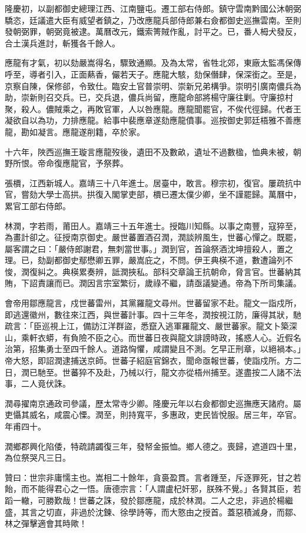 \begin{pinyinscope}
隆慶初，以副都御史總理江西、江南鹽屯。遷工部右侍郎。鎮守雲南黔國公沐朝弼驕恣，廷議遣大臣有威望者鎮之，乃改應龍兵部侍郎兼右僉都御史巡撫雲南。至則發朝弼罪，朝弼竟被逮。萬曆改元，鐵索箐賊作亂，討平之。已，番人栂犬發反，合土漢兵進討，斬獲各千餘人。

應龍有才氣，初以劾嚴嵩得名，驟致通顯。及為太常，省牲北郊，東廠太監馮保傳呼至，導者引入，正面爇香，儼若天子。應龍大駭，劾保僭肆，保深銜之。至是，京察自陳，保修郤，令致仕。臨安土官普崇明、崇新兄弟構爭。崇明引廣南儂兵為助，崇新則召交兵。已，交兵退，儂兵尚留，應龍命部將楊守廉往剿。守廉掠村聚，殺人。儂賊乘之，再敗官軍，人以咎應龍。應龍聞罷官，不俟代徑歸。代者王凝欲自以為功，力排應龍。給事中裴應章遂劾應龍僨事。巡按御史郭廷梧雅不善應龍，勘如凝言。應龍遂削籍，卒於家。

十六年，陜西巡撫王璇言應龍歿後，遺田不及數畝，遺址不過數楹，恤典未被，朝野所恨。帝命復應龍官，予祭葬。

張檟，江西新城人。嘉靖三十八年進士。居臺中，敢言。穆宗初，復官。屢疏抗中官，嘗劾大學士高拱。拱復入閣掌吏部，檟已遷太僕少卿，坐不謹罷歸。萬曆中，累官工部右侍郎。

林潤，字若雨，莆田人。嘉靖三十五年進士。授臨川知縣。以事之南豐，寇猝至，為畫計卻之。征授南京御史。嚴世蕃置酒召潤，潤談辨風生，世蕃心憚之。既罷，屬客謂之曰：「嚴侍郎謝君，無刺當世事。」潤到官，首論祭酒沈坤擅殺人，置之理。已，劾副都御史鄢懋卿五罪，嚴嵩庇之，不問。伊王典楧不道，數遭論列不悛，潤復糾之。典楧累奏辨，詆潤挾私。部科交章論王抗朝命，脅言官。世蕃納其賄，下詔責讓而已。潤因言宗室繁衍，歲祿不繼，請亟議變通。帝為下所司集議。

會帝用鄒應龍言，戍世蕃雷州，其黨羅龍文尋州。世蕃留家不赴。龍文一詣戍所，即逃還徽州，數往來江西，與世蕃計事。四十三年冬，潤按視江防，廉得其狀，馳疏言：「臣巡視上江，備訪江洋群盜，悉竄入逃軍羅龍文、嚴世蕃家。龍文卜築深山，乘軒衣蟒，有負險不臣之心。而世蕃日夜與龍文誹謗時政，搖惑人心。近假名治第，招集勇士至四千餘人。道路恟懼，咸謂變且不測。乞早正刑章，以絕禍本。」帝大怒，即詔潤逮捕送京師。世蕃子紹庭官錦衣，聞命亟報世蕃，使詣戍所。方二日，潤已馳至。世蕃猝不及赴，乃械以行，龍文亦從梧州捕至。遂盡按二人諸不法事，二人竟伏誅。

潤尋擢南京通政司參議，歷太常寺少卿。隆慶元年以右僉都御史巡撫應天諸府。屬吏懾其威名，咸震心慄。潤至，則持寬平，多惠政，吏民皆悅服。居三年，卒官。年甫四十。

潤鄉郡興化陷倭，特疏請蠲復三年，發帑金振恤。鄉人德之。喪歸，遮道四十里，為位祭哭凡三日。

贊曰：世宗非庸懦主也。嵩相二十餘年，貪裛盈貫。言者踵至，斥逐罪死，甘之若飴，而不能得君心之一悟。唐德宗言：「人謂盧杞奸邪，朕殊不覺。」各賢其臣，若蹈一轍，可勝歎哉！世蕃之誅，發於鄒應龍，成於林潤。二人之忠，非過於楊繼盛，其言之切直，非過於沈鍊、徐學詩等，而大憝由之授首。蓋惡積滅身，而鄒、林之彈擊適會其時歟！


\end{pinyinscope}